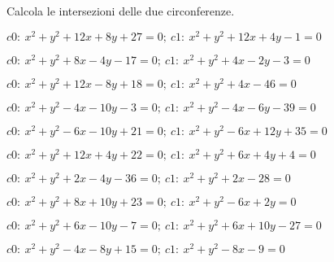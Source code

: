 \newpage
\begin{esercizio}\label{ese:}
 Calcola le intersezioni delle due circonferenze.
 \begin{enumeratea}
  \item  \(c0:~x^2 + y^2 +12x +8y +27 = 0;~c1:~x^2 + y^2 +12x +4y -1 = 0\)\\
   \makebox[\linewidth][r]
   {[\(ar:~y = -7;~A \punto{-10}{-7};~B \punto{-2}{-7}\)]}
  \item  \(c0:~x^2 + y^2 +8x -4y -17 = 0;~c1:~x^2 + y^2 +4x -2y -3 = 0\)\\
   \makebox[\linewidth][r]
   {[\(ar:~y = 2x -7;~\emptyset\)]}
  \item  \(c0:~x^2 + y^2 +12x -8y +18 = 0;~c1:~x^2 + y^2 +4x -46 = 0\)\\
   \makebox[\linewidth][r]
   {[\(ar:~y = x +8;~A \punto{-1}{7};~B \punto{-9}{-1}\)]}
  \item  \(c0:~x^2 + y^2 -4x -10y -3 = 0;~c1:~x^2 + y^2 -4x -6y -39 = 0\)\\
   \makebox[\linewidth][r]
   {[\(ar:~y = 9;~A \punto{6}{9};~B \punto{-2}{9}\)]}
  \item  \(c0:~x^2 + y^2 -6x -10y +21 = 0;~c1:~x^2 + y^2 -6x +12y +35 = 0\)\\
   \makebox[\linewidth][r]
   {[\(ar:~y = -\frac{7}{11};~\emptyset\)]}
  \item  \(c0:~x^2 + y^2 +12x +4y +22 = 0;~c1:~x^2 + y^2 +6x +4y +4 = 0\)\\
   \makebox[\linewidth][r]
   {[\(ar:~x = -3;~A \punto{-3}{1};~B \punto{-3}{1}\)]}
  \item  \(c0:~x^2 + y^2 +2x -4y -36 = 0;~c1:~x^2 + y^2 +2x -28 = 0\)\\
   \makebox[\linewidth][r]
   {[\(ar:~y = -2;~A \punto{-6}{-2};~B \punto{4}{-2}\)]}
  \item  \(c0:~x^2 + y^2 +8x +10y +23 = 0;~c1:~x^2 + y^2 -6x +2y  = 0\)\\
   \makebox[\linewidth][r]
   {[\(ar:y = -\frac{7}{4}x -\frac{23}{8};~\emptyset\)]}
  \item  \(c0:~x^2 + y^2 +6x -10y -7 = 0;~c1:~x^2 + y^2 +6x +10y -27 = 0\)\\
   \makebox[\linewidth][r]
   {[\(ar:~y = 1;~A \punto{-8}{1};~B \punto{2}{1}\)]}
  \item  \(c0:~x^2 + y^2 -4x -8y +15 = 0;~c1:~x^2 + y^2 -8x -9 = 0\)\\
   \makebox[\linewidth][r]
   {[\(ar:~y = \frac{1}{2} x +3;~A \punto{0}{3};~B \punto{4}{5}\)]}
 \end{enumeratea}
\end{esercizio}



